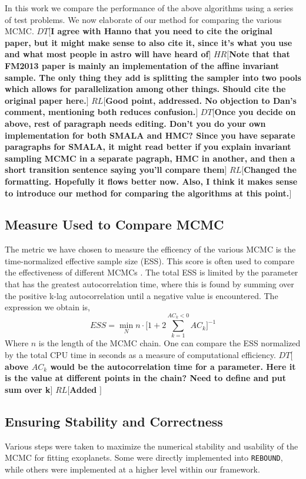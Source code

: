 \documentclass{aa}
\def\memohr#1{\color{blue}$HR[${\bf #1}$]$ \color{black}}
\def\memodt#1{\color{green}$DT[${\bf #1}$]$ \color{black}}
\def\memorl#1{\color{gray}$RL[${\bf #1}$]$ \color{black}}
\newcommand{\reb}{{\sc \tt REBOUND}\xspace}
\begin{document}
In this work we compare the performance of the above algorithms using a series of test problems. We now elaborate of our method for comparing the various MCMC. 
\memodt{I agree with Hanno that you need to cite the original paper, but it might make sense to also cite it, since it's what you use and what most people in astro will have heard of}
\memohr{Note that that FM2013 paper is mainly an implementation of the affine invariant sample. The only thing they add is splitting the sampler into two pools which allows for parallelization among other things. Should cite the original paper here.} 
\memorl{Good point, addressed. No objection to Dan's comment, mentioning both reduces confusion.}
\memodt{Once you decide on above, rest of paragraph needs editing. Don't you do your own implementation for both SMALA and HMC? Since you have separate paragraphs for SMALA, it might read better if you explain invariant sampling MCMC in a separate pagraph, HMC in another, and then a short transition sentence saying you'll compare them}
\memorl{Changed the formatting. Hopefully it flows better now. Also, I think it makes sense to introduce our method for comparing the algorithms at this point.}

\subsection{Measure Used to Compare MCMC}

The metric we have chosen to measure the efficency of the various MCMC is the time-normalized effective sample size (ESS).
This score is often used to compare the effectiveness of different MCMCs \citep[e.g.,][]{Girolami2011, 1504.01418, Meyer2016, Lan2015}.
The total ESS is limited by the parameter that has the greatest autocorrelation time, where this is found by summing over the positive k-lag autocorrelation until a negative value is encountered. The expression we obtain is, $$ESS = \min_N n \cdot \Bigg[1+2\sum\limits_{k=1}^{AC_k < 0} AC_k\Bigg]^{-1}$$ Where $n$ is the length of the MCMC chain. One can compare the ESS normalized by the total CPU time in seconds as a measure of computational efficiency. 
\memodt{above $AC_k$ would be the autocorrelation time for a parameter. Here it is the value at different points in the chain? Need to define and put sum over k}
\memorl{Added }

\subsection{Ensuring Stability and Correctness}
Various steps were taken to maximize the numerical stability and usability of the MCMC for fitting exoplanets. Some were directly implemented into \reb, while others were implemented at a higher level within our framework.
\end{document}
